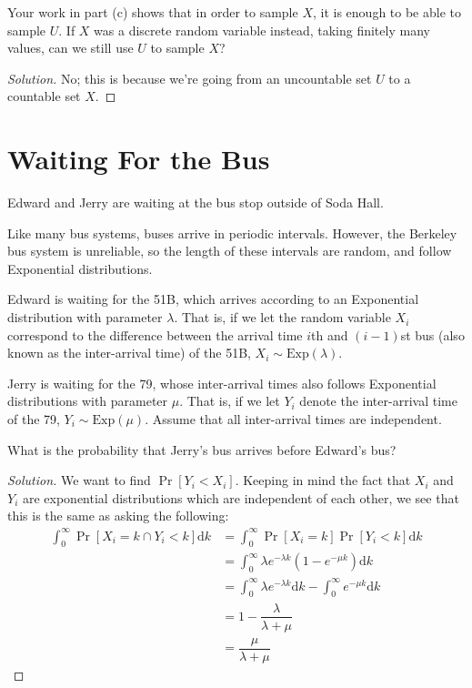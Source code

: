\documentclass{article}
\newenvironment{solution}{\begin{proof}[Solution]}{\end{proof}}
\begin{document}
\begin{hw}
	Your work in part (c) shows that in order to sample $X$, it is enough
	to be able to sample $U$. If $X$ was a discrete random variable instead,
	taking finitely many values, can we still use $U$ to sample $X$?
\end{hw}
\begin{solution}
	No; this is because we're going from an uncountable set $U$ to a countable set $X$.
\end{solution}

\newpage

\section{Waiting For the Bus}
Edward and Jerry are waiting at the bus stop outside of Soda Hall.

Like many bus systems, buses arrive in periodic intervals. However, the Berkeley bus system is unreliable, so the length of these intervals are random, and follow Exponential distributions.

Edward is waiting for the 51B, which arrives according to an Exponential distribution with parameter $\lambda$. That is, if we let the random variable $X_i$ correspond to the difference between the arrival time $i$th and $(i-1)$st bus (also known as the inter-arrival time) of the 51B, $X_i \sim \mathrm{Exp}(\lambda)$.

Jerry is waiting for the 79, whose inter-arrival times also follows Exponential distributions with parameter $\mu$. That is, if we let $Y_i$ denote the inter-arrival time of the 79, $Y_i \sim \mathrm{Exp}(\mu)$. Assume that all inter-arrival times are independent.

\begin{hw}
	What is the probability that Jerry's bus arrives before Edward's bus?
\end{hw}
\begin{solution}
	We want to find $\Pr[Y_{i} < X_{i}]$. Keeping in mind the fact that $X_{i}$ and $Y_{i}$ are exponential distributions which are independent of each other, we see that this is the same as asking the following:
	\begin{align*}
		\int_{0}^{\infty} \Pr[X_{i} = k \cap Y_{i} < k] \mathrm{d}k &= \int_{0}^{\infty} \Pr[X_{i} = k] \Pr[ Y_{i} < k] \mathrm{d}k \\
		&= \int_{0}^{\infty} \lambda e^{-\lambda k}\left( 1 - e^{-\mu k} \right) \mathrm{d}k \\
		&= \int_{0}^{\infty} \lambda e^{-\lambda k} \mathrm{d}k - \int_{0}^{\infty} e^{-\mu k} \mathrm{d}k \\
		&= 1 - \dfrac{\lambda}{\lambda + \mu} \\
		&= \dfrac{\mu}{\lambda + \mu}
	\end{align*}
\end{solution}
\end{document}
